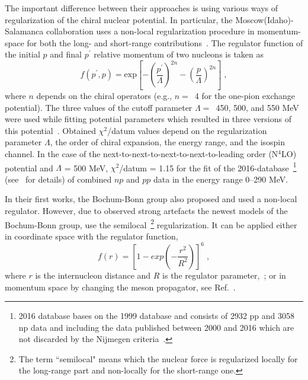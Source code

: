 The important difference between their approaches is using various ways of regularization of the chiral nuclear potential. In particular, the Moscow(Idaho)-Salamanca collaboration uses a non-local regularization procedure in momentum-space for both the long- and short-range contributions~\cite{Entem2017}. The regulator function of the initial $p$ and final $p^{\prime}$ relative momentum of two nucleons is taken as 
\begin{equation}
f (p^{\prime}, p) = \mathrm{exp}\left[-\left(\frac{p^{\prime}}{\Lambda}\right)^{2n} - \left(\frac{p}{\Lambda}\right)^{2n}\right]\;,
\end{equation}
where $n$ depends on the chiral operators (e.g., $n =$~4 for the one-pion exchange potential). The three values of the cutoff parameter $\Lambda =$~450, 500, and 550 MeV were used while fitting potential parameters which resulted in three versions of this potential~\cite{Entem2017}.
Obtained $\chi^{2}$/datum values depend on the regularization parameter $\Lambda$, the order of chiral expansion, the energy range, and the isospin channel. In the case of the next-to-next-to-next-to-next-to-leading order (N$^{4}$LO) potential and $\Lambda$ = 500 MeV, $\chi^{2}$/datum = 1.15 for the fit of the 2016-database~\footnote{2016 database bases on the 1999 database and consists of 2932 pp and 3058 np data and including the data published between 2000 and 2016 which are not discarded by the Nijmegen criteria~\cite{Bergervoet1988}. 
} (see~\cite{Entem2017} for details) of combined $np$ and $pp$ data in the energy range 0–290 MeV. 

In their first works, the Bochum-Bonn group also proposed and used a non-local regulator. However, due to observed strong artefacts the newest models of the Bochum-Bonn group, use the semilocal~\footnote{The term ``semilocal" means which the nuclear force is regularized locally for the long-range part and non-locally for the short-range one.} regularization. It can be applied either in  coordinate space with the regulator function,
\begin{equation}
f(r) = \left[ 1- exp\left(-\frac{r^{2}}{R^{2}}\right)\right]^{6}\;,
\label{reg_coord}
\end{equation}
where $r$ is the internucleon distance and $R$ is the regulator parameter,~\cite{Epelbaum2015, Epelbaum2015a}; or in momentum space by changing the meson propagator, see Ref.~\cite{Reinert2018}. 

